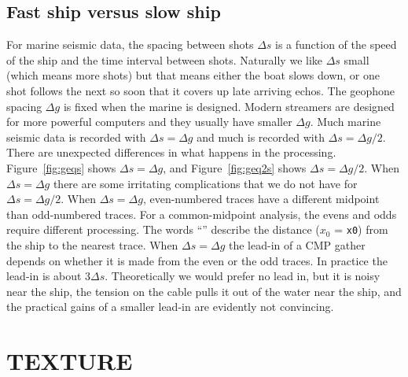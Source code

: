 \subsection{Fast ship versus slow ship}
For marine seismic data,
the spacing between shots $\Delta s$ is a function of the speed
of the ship and the time interval between shots.
Naturally we like $\Delta s$ small
(which means more shots)
but that means either the boat slows down,
or one shot follows the next so soon
that it covers up late arriving echos.
The geophone spacing $\Delta g$ is fixed
when the marine  is designed.
Modern streamers are designed for more powerful
computers and they usually have smaller $\Delta g$.
Much marine seismic data is recorded with
$\Delta s = \Delta g$
and much is recorded with
$\Delta s = \Delta g/2$.
There are unexpected differences in what happens in the processing.
Figure~\ref{fig:geqs} shows
$\Delta s = \Delta g$,
and
Figure~\ref{fig:geq2s} shows
$\Delta s = \Delta g/2$. %
%
When $\Delta s = \Delta g$ there are some irritating complications
that we do not have for $\Delta s = \Delta g/2$.
When $\Delta s = \Delta g$, even-numbered traces
have a different midpoint than odd-numbered traces.
For a common-midpoint analysis,
the evens and odds require different processing.
The words ``'' describe the distance ($x_0$ = {\tt x0})
from the ship to the nearest trace.
When $\Delta s = \Delta g$ the lead-in of a CMP gather
depends on whether it is made from the even or the odd traces.
In practice the lead-in is about $3\Delta s$.
Theoretically we would prefer no lead in,
but it is noisy near the ship,
the tension on the cable pulls it out of the water near the ship,
and the practical gains
of a smaller lead-in are evidently not convincing.


\section{TEXTURE}

